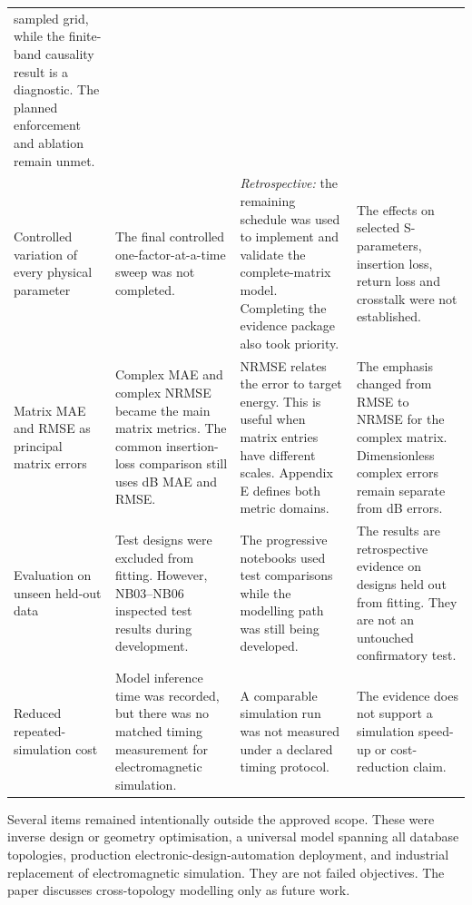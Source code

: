 \begin{table}[!htbp]
\begin{tabular}{@{}p{}p{}
                         p{}p{}@{}}
            sampled grid, while the finite-band causality result is a
            diagnostic. The planned enforcement and ablation remain unmet. \\
        Controlled variation of every physical parameter
          & The final controlled one-factor-at-a-time sweep was not completed.
          & \emph{Retrospective:} the remaining schedule was used to implement
            and validate the complete-matrix model. Completing the evidence
            package also took priority.
          & The effects on selected S-parameters, insertion loss, return loss
            and crosstalk were not established. \\
        Matrix MAE and RMSE as principal matrix errors
          & Complex MAE and complex NRMSE became the main matrix metrics. The
            common insertion-loss comparison still uses dB MAE and RMSE.
          & NRMSE relates the error to target energy. This is useful when matrix
            entries have different scales. Appendix E defines both metric
            domains.
          & The emphasis changed from RMSE to NRMSE for the complex matrix.
            Dimensionless complex errors remain separate from dB errors. \\
        Evaluation on unseen held-out data
          & Test designs were excluded from fitting. However, NB03--NB06
            inspected test results during development.
          & The progressive notebooks used test comparisons while the modelling
            path was still being developed.
          & The results are retrospective evidence on designs held out from
            fitting. They are not an untouched confirmatory test. \\
        Reduced repeated-simulation cost
          & Model inference time was recorded, but there was no matched timing
            measurement for electromagnetic simulation.
          & A comparable simulation run was not measured under a declared
            timing protocol.
          & The evidence does not support a simulation speed-up or cost-reduction
            claim. \\
        \bottomrule
    \end{tabular}
\end{table}

Several items remained intentionally outside the approved scope. These were
inverse design or geometry optimisation, a universal model spanning all
database topologies, production electronic-design-automation deployment, and
industrial replacement of electromagnetic simulation. They are not failed
objectives. The paper discusses cross-topology modelling only as future work.

